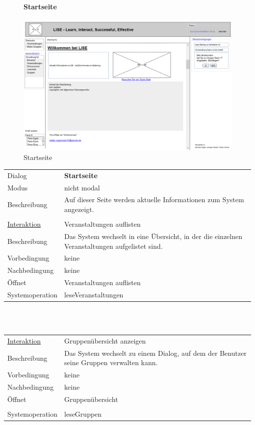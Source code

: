 \documentclass[12pt,a4paper]{article}
\begin{document}
{\begin{figure}[H]
	\centering
	\paragraph{Startseite}
	\includegraphics[width=\textwidth]{Bilder/Mockups/GUI/Startseite.png}
	\caption{Startseite}
	\label{GuiStartseite}
\end{figure}

\begin{tabular}{l p{12cm}}
Dialog 	 & \textbf{Startseite} \\ 
Modus & nicht modal\\ 
Beschreibung   	 & Auf dieser Seite werden aktuelle Informationen zum System angezeigt.\\\\

\underline{Interaktion} 	 & Veranstaltungen auflisten\\ 
Beschreibung   	 & Das System wechselt in eine Übersicht, in der die einzelnen Veranstaltungen aufgelistet sind.\\
Vorbedingung	& keine \\
Nachbedingung	& keine \\
Öffnet			& \glqq Veranstaltungen auflisten\grqq \\
Systemoperation & leseVeranstaltungen\\
\end{tabular}\\\\

\begin{tabular}{l p{12cm}}
\underline{Interaktion} 	 & Gruppenübersicht anzeigen\\ 
Beschreibung   	 & Das System wechselt zu einem Dialog, auf dem der Benutzer seine Gruppen verwalten kann.\\
Vorbedingung	& keine \\
Nachbedingung	& keine \\
Öffnet			& \glqq Gruppenübersicht\grqq \\\\
Systemoperation & leseGruppen\\
\end{tabular}\\\\

}
\end{document}
